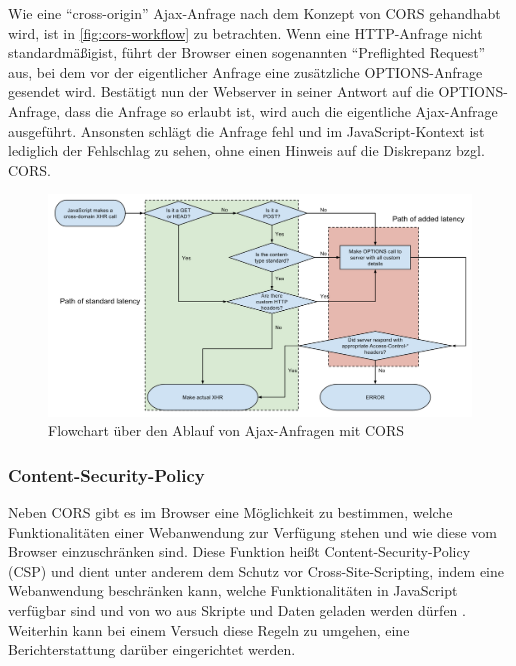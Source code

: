 Wie eine \enquote{cross-origin} Ajax-Anfrage nach dem Konzept von CORS gehandhabt wird, ist in \autoref{fig:cors-workflow} zu betrachten. Wenn eine HTTP-Anfrage nicht standardmäßig\footnotemark ist, führt der Browser einen sogenannten \enquote{Preflighted Request} aus, bei dem vor der eigentlicher Anfrage eine zusätzliche OPTIONS-Anfrage gesendet wird. Bestätigt nun der Webserver in seiner Antwort auf die OPTIONS-Anfrage, dass die Anfrage so erlaubt ist, wird auch die eigentliche Ajax-Anfrage ausgeführt. Ansonsten schlägt die Anfrage fehl und im JavaScript-Kontext ist lediglich der Fehlschlag zu sehen, ohne einen Hinweis auf die Diskrepanz bzgl. CORS.


\begin{figure}[H]
	\centering
	\includegraphics[width=\linewidth]{img/02_theorie/1280px-Flowchart_showing_Simple_and_Preflight_XHR.svg.png}
	\caption{Flowchart über den Ablauf von Ajax-Anfragen mit CORS \cite{FlowchartCORS}}
	\label{fig:cors-workflow}
\end{figure}

\subsubsection{Content-Security-Policy}


Neben CORS gibt es im Browser eine Möglichkeit zu bestimmen, welche Funktionalitäten einer Webanwendung zur Verfügung stehen und wie diese vom Browser einzuschränken sind. Diese Funktion heißt Content-Security-Policy (CSP) und dient unter anderem dem Schutz vor Cross-Site-Scripting, indem eine Webanwendung beschränken kann, welche Funktionalitäten in JavaScript verfügbar sind und von wo aus Skripte und Daten geladen werden dürfen \cite{MDNContentSecurityPolicy}. Weiterhin kann bei einem Versuch diese Regeln zu umgehen, eine Berichterstattung darüber eingerichtet werden.


